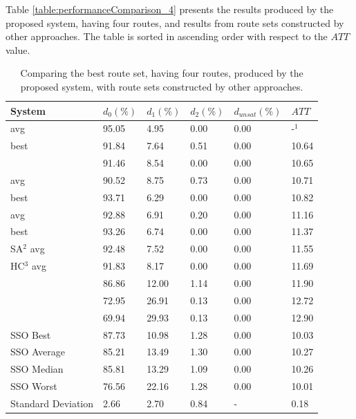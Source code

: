 Table \vref{table:performanceComparison_4} presents the results produced by the proposed system, having four routes, and results from route sets constructed by other approaches. The table is sorted in ascending order with respect to the $ATT$ value.

\begin{table}[H]
	\centering
    \hspace*{-1.0cm}
    \begin{tabular}{|l||l|l|l|l|l|}
 	\hline
 	\textbf{System} & $d_0(\%)$ & $d_1(\%)$ & $d_2(\%)$ & $d_{unsat}(\%)$ & $ATT$ \\
 	\hline
    \citet{nikolic14} avg & 95.05 & 4.95 & 0.00 & 0.00 & -$^1$ \\
    \citet{kechagiopoulos14} best & 91.84 & 7.64 & 0.51 & 0.00 & 10.64 \\
    \citet{zhang10} & 91.46 & 8.54 & 0.00 & 0.00 & 10.65 \\
    \citet{kechagiopoulos14} avg & 90.52 & 8.75 & 0.73 & 0.00 & 10.71 \\
    \citet{chew12} best & 93.71 & 6.29 & 0.00 & 0.00 & 10.82 \\
    \citet{chew12} avg & 92.88 & 6.91 & 0.20 & 0.00 & 11.16 \\
    \citet{fan10} best & 93.26 & 6.74 & 0.00 & 0.00 & 11.37 \\
    \citet{fan10} SA$^2$ avg & 92.48 & 7.52 & 0.00 & 0.00 & 11.55 \\
    \citet{fan10} HC$^3$ avg & 91.83 & 8.17 & 0.00 & 0.00 & 11.69 \\
    \citet{chakroborty02} & 86.86 & 12.00 & 1.14 & 0.00 & 11.90 \\
    \citet{kidwai98} & 72.95 & 26.91 & 0.13 & 0.00 & 12.72 \\
    \citet{mandl79} & 69.94 & 29.93 & 0.13 & 0.00 & 12.90 \\
    \hline
    SSO Best & 87.73 & 10.98 & 1.28 & 0.00 & 10.03\\
    SSO Average & 85.21 & 13.49 & 1.30 & 0.00 & 10.27\\
    SSO Median & 85.81 & 13.29 & 1.09 & 0.00 & 10.26\\
    SSO Worst & 76.56 & 22.16 & 1.28 & 0.00 & 10.01\\
    Standard Deviation & 2.66 & 2.70 & 0.84 & - & 0.18\\
    \hline
    \end{tabular}
    \caption {Comparing the best route set, having four routes, produced by the proposed system, with route sets constructed by other approaches.}

\end{table}
